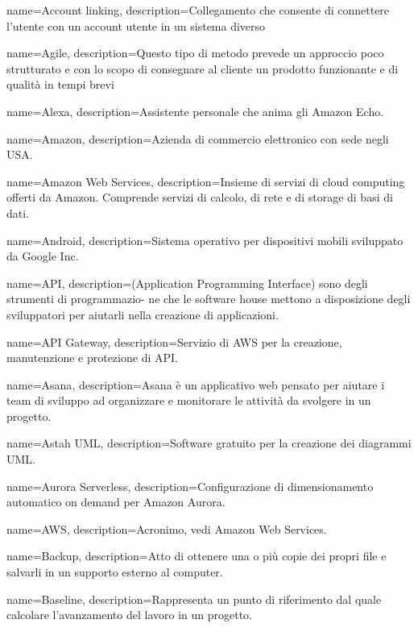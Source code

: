 {
name={Account linking},
description={Collegamento che consente di connettere l’utente con un account utente in
un sistema diverso}
}

{
name={Agile},
description={Questo tipo di metodo prevede un approccio poco strutturato e con lo scopo
di consegnare al cliente un prodotto funzionante e di qualità in tempi brevi}
}

{
name={Alexa},
description={Assistente personale che anima gli Amazon Echo.}
}

{
name={Amazon},
description={Azienda di commercio elettronico con sede negli USA.}
}

{
name={Amazon Web Services},
description={Insieme di servizi di cloud computing offerti da Amazon. Comprende servizi di calcolo, di rete e di storage di basi di dati.}
}

{
name={Android},
description={Sistema operativo per dispositivi mobili sviluppato da Google Inc.}
}

{
name={API},
description={(Application Programming Interface) sono degli strumenti di programmazio-
ne che le software house mettono a disposizione degli sviluppatori per aiutarli
nella creazione di applicazioni.}
}

{
name={API Gateway},
description={Servizio di AWS per la creazione, manutenzione e protezione di API.}
}

{
name={Asana},
description={Asana è un applicativo web pensato per aiutare i team di sviluppo ad organizzare e monitorare le attività da svolgere in un progetto.}
}

{
name={Astah UML},
description={Software gratuito per la creazione dei diagrammi UML.}
}

{
name={Aurora Serverless},
description={Configurazione di dimensionamento automatico on demand per Amazon Aurora.}
}

{
name={AWS},
description={Acronimo, vedi Amazon Web Services.}
}

{
name={Backup},
description={Atto di ottenere una o più copie dei propri file e salvarli in un supporto esterno al computer.}
}

{
name={Baseline},
description={Rappresenta un punto di riferimento dal quale calcolare l’avanzamento del lavoro in un progetto.}
}

